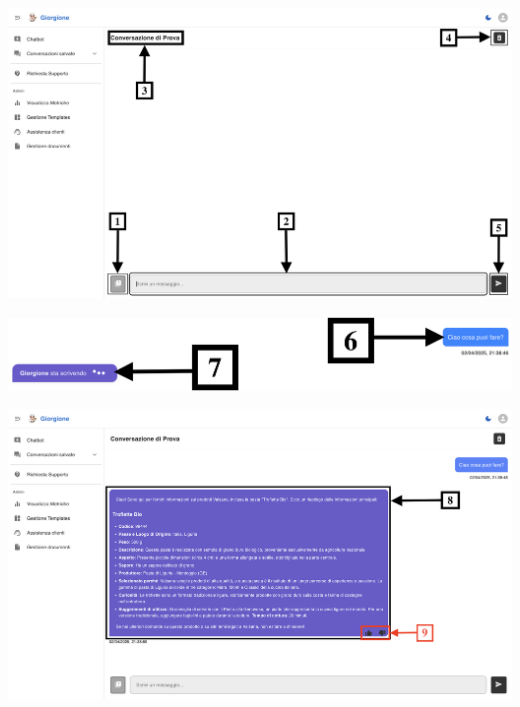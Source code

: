 \begin{center}
    \includegraphics[width=\textwidth]{./img/SchermataChat1.png}
    \label{fig:schermata-chat}
\end{center}

\begin{center}
    \includegraphics[width=\textwidth]{./img/SchermataChat2.png}
    \label{fig:Elaborazione}
\end{center}

\begin{center}
    \includegraphics[width=\textwidth]{./img/SchermataChat3.png}
    \label{fig:Visualizzazione Risposta}
\end{center}

